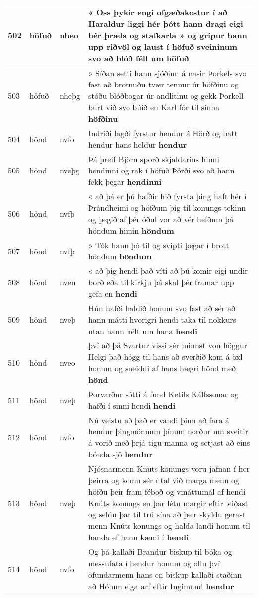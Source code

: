 \documentclass{article}
\begin{document}
\begin{longtable}{p{1cm}|p{1cm}|p{1cm}|p{13cm}}
\hline
502&höfuð&nheo&« Oss þykir engi ofgæðakostur í að Haraldur liggi hér þótt hann dragi eigi hér þræla og stafkarla » og grípur hann upp riðvöl og laust í höfuð sveininum svo að blóð féll um \textbf{höfuð} \\
\hline
503&höfuð&nheþg&» Síðan setti hann sjóðinn á nasir Þorkels svo fast að brotnuðu tvær tennur úr höfðinu og stóðu blóðbogar úr andlitinu og gekk Þorkell burt við svo búið en Karl fór til sinna \textbf{höfðinu} \\
\hline
504&hönd&nvfo&Indriði lagði fyrstur hendur á Hörð og batt hendur hans heldur \textbf{hendur} \\
\hline
505&hönd&nveþg&Þá þreif Björn sporð skjaldarins hinni hendinni og rak í höfuð Þórði svo að hann fékk þegar \textbf{hendinni} \\
\hline
506&hönd&nvfþ&« að þá er þú hafðir hið fyrsta þing haft hér í Þrándheimi og höfðum þig til konungs tekinn og þegið af þér óðul vor að vér hefðum þá höndum himin \textbf{höndum} \\
\hline
507&hönd&nvfþ&» Tók hann þó til og svipti þegar í brott höndum \textbf{höndum} \\
\hline
508&hönd&nven&« að þig hendi það víti að þú komir eigi undir borð eða til kirkju þá skal þér framar upp gefa en \textbf{hendi} \\
\hline
509&hönd&nveþ&Hún hafði haldið honum svo fast að sér að hann mátti hvorigri hendi taka til nokkurs utan hann hélt um hana \textbf{hendi} \\
\hline
510&hönd&nveo&því að þá Svartur vissi sér minnst von höggur Helgi það högg til hans að sverðið kom á öxl honum og sneiddi af hans hægri hönd með \textbf{hönd} \\
\hline
511&hönd&nveþ&Þorvarður sótti á fund Ketils Kálfssonar og hafði í sinni hendi \textbf{hendi} \\
\hline
512&hönd&nvfo&Nú veistu að það er vandi þinn að fara á hendur þingmönnum þínum norður um sveitir á vorið með þrjá tigu manna og setjast að eins bónda sjö \textbf{hendur} \\
\hline
513&hönd&nveþ&Njósnarmenn Knúts konungs voru jafnan í her þeirra og komu sér í tal við marga menn og höfðu þeir fram féboð og vináttumál af hendi Knúts konungs en þar létu margir eftir leiðast og seldu þar til trú sína að þeir skyldu gerast menn Knúts konungs og halda landi honum til handa ef hann kæmi í \textbf{hendi} \\
\hline
514&hönd&nvfo&Og þá kallaði Brandur biskup til bóka og messufata í hendur honum og ollu því öfundarmenn hans en biskup kallaði staðinn að Hólum eiga arf eftir Ingimund \textbf{hendur} \\

\end{longtable}
\end{document}
